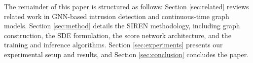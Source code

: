 The remainder of this paper is structured as follows: Section \ref{sec:related} reviews related work in GNN-based intrusion detection and continuous-time graph models. Section \ref{sec:method} details the SIREN methodology, including graph construction, the SDE formulation, the score network architecture, and the training and inference algorithms. Section \ref{sec:experiments} presents our experimental setup and results, and Section \ref{sec:conclusion} concludes the paper.
